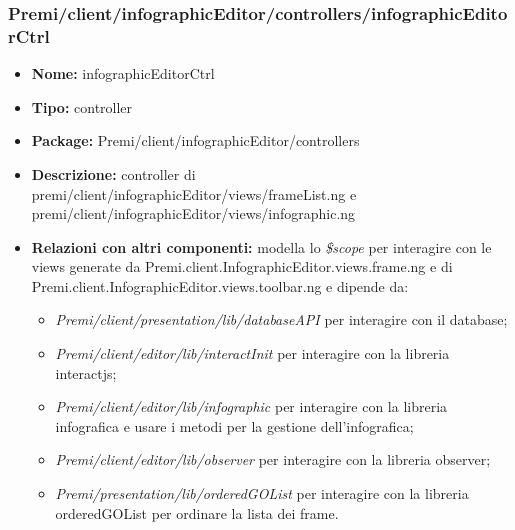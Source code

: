 \subsubsection{Premi/client/infographicEditor/controllers/infographicEditorCtrl}
\begin{itemize}
  \item[] \textbf{Nome:} infographicEditorCtrl
  \item[] \textbf{Tipo:} controller
  \item[] \textbf{Package:} Premi/client/infographicEditor/controllers
  \item[] \textbf{Descrizione:} controller di premi/client/infographicEditor/views/frameList.ng e premi/client/infographicEditor/views/infographic.ng
  \item[] \textbf{Relazioni con altri componenti:} modella lo \textit{\$scope} per interagire con le views generate da Premi.client.InfographicEditor.views.frame.ng e di Premi.client.InfographicEditor.views.toolbar.ng e dipende da: 
  \begin{itemize}  
  \item[] \textit{Premi/client/presentation/lib/databaseAPI} per interagire con il database;
  \item[] \textit{Premi/client/editor/lib/interactInit} per interagire con la libreria interactjs;
  \item[] \textit{Premi/client/editor/lib/infographic} per interagire con la libreria infografica e usare i metodi per la gestione dell'infografica;
  \item[] \textit{Premi/client/editor/lib/observer} per interagire con la libreria observer;
  \item[] \textit{Premi/presentation/lib/orderedGOList} per interagire con la libreria orderedGOList per ordinare la lista dei frame. 
  \end{itemize}
\end{itemize}

